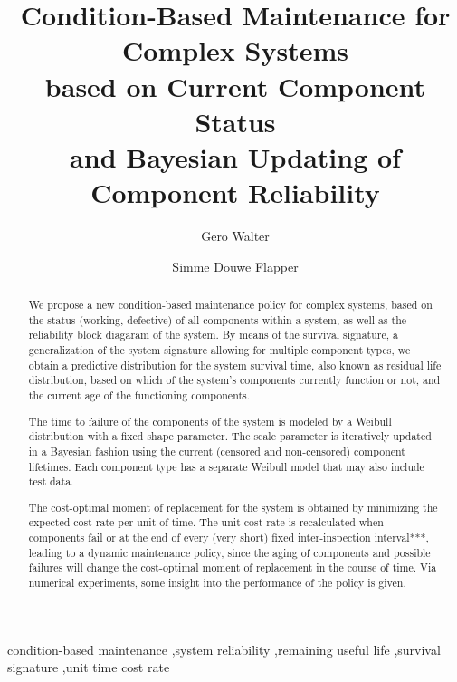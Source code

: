 \documentclass[authoryear]{elsarticle}
\begin{document}

\begin{frontmatter}
\title{Condition-Based Maintenance for Complex Systems\\ based on Current Component Status\\ and Bayesian Updating of Component Reliability}

\author[tue]{Gero Walter}
\author[tue]{Simme Douwe Flapper}

\address[tue]{School of Industrial Engineering, Eindhoven University of Technology, Eindhoven, The Netherlands}


\begin{abstract}
We propose a new condition-based maintenance policy for complex systems,
based on the status (working, defective) of all components within a system,
as well as the reliability block diagaram of the system.
%
By means of the survival signature,
a generalization of the system signature allowing for multiple component types,
we obtain a predictive distribution for the system survival time,
also known as residual life distribution,
based on which of the system's components currently function or not,
and the current age of the functioning components.

The time to failure of the components of the system
is modeled by a Weibull distribution with a fixed shape parameter.
The scale parameter is iteratively updated in a Bayesian fashion
using the current (censored and non-censored) component lifetimes.
Each component type has a separate Weibull model that may also include test data.

The cost-optimal moment of replacement for the system is obtained by minimizing
the expected cost rate per unit of time.
The unit cost rate is recalculated when components fail
or at the end of every (very short) fixed inter-inspection interval***,
leading to a dynamic maintenance policy,
since the aging of components and possible failures will change the cost-optimal moment of replacement in the course of time.
Via numerical experiments, some insight into the performance of the policy is given.
\end{abstract}

\begin{keyword}
condition-based maintenance \sep system reliability \sep remaining useful life \sep survival signature \sep unit time cost rate\end{keyword}
\end{frontmatter}
\end{document}
